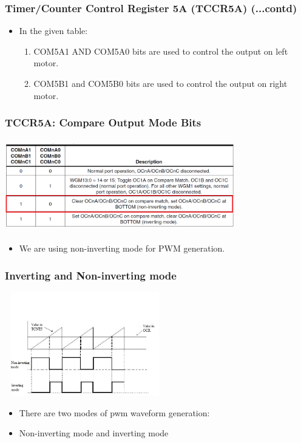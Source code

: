 \documentclass[table,10pt,red]{beamer}	%
\begin{document}
\begin{frame}
	\frametitle{Timer/Counter Control Register 5A (TCCR5A) (...contd)}
	\begin{itemize}
		\item <+-|alert@+> In the given table:
		\begin{enumerate} [$\checkmark$]
			\item <+-|alert@+> COM5A1 AND COM5A0 bits are used to control the output on left motor. 
			\item <+-|alert@+> COM5B1 and COM5B0 bits are used to control the output on right motor.
		\end{enumerate}
	\end{itemize}
	
\end{frame}	
\begin{frame}
\frametitle{TCCR5A: Compare Output Mode Bits}
\begin{center}
	\item <+-|alert@+>\includegraphics[height=4cm, width=10cm]{com_bits}
\end{center}
	\begin{itemize}
		\item <+-|alert@+> We are using non-inverting mode for PWM generation.
	\end{itemize}
\end{frame}	
\begin{frame}
	\frametitle{Inverting and Non-inverting mode}
	\centering
	\includegraphics[height = 4.5cm, width = 7cm]{pwm_output}
	\begin{itemize}
		\item <+-|alert@+> There are two modes of pwm waveform generation:
		\item <+-|alert@+> Non-inverting mode and inverting mode 
	\end{itemize}
\end{frame}	
\end{document}
